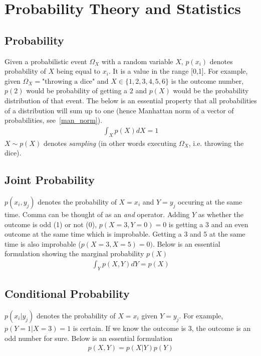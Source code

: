 \documentclass{book}
\numberwithin{equation}{subsection}
\begin{document}
\chapter{Probability Theory and Statistics}
\section{Probability}
Given a probabilistic event $\Omega_X$ with a random variable $X$, $p(x_i)$ denotes probability of $X$ being equal to $x_i$. It is a value in the range [0,1]. For example, given $\Omega_X=\text{"throwing a dice"}$ and $X \in \{1,2,3,4,5,6\}$ is the outcome number, $p(2)$ would be probability of getting a $2$ and $p(X)$ would be the probability distribution of that event. The below is an essential property that all probabilities of a distribution will sum up to one (hence Manhattan norm of a vector of probabilities, see~\ref{man_norm}).
\begin{align}
    \int_X p(X)dX = 1
\end{align}
$X \sim p(X)$ denotes \textit{sampling} (in other words executing $\Omega_X$, i.e. throwing the dice).
\section{Joint Probability}
$p(x_i, y_j)$ denotes the probability of $X=x_i$ and $Y=y_j$ occuring at the same time. Comma can be thought of as an \textit{and} operator. Adding $Y$ as whether the outcome is odd (1) or not (0), $p(X=3,Y=0)=0$ is getting a 3 and an even outcome at the same time which is improbable. Getting a 3 and 5 at the same time is also improbable ($p(X=3,X=5)=0)$. Below is an essential formulation showing the marginal probability $p(X)$
\begin{align}
    \int_Y p(X,Y)dY = p(X)
\end{align}
\section{Conditional Probability}
$p(x_i|y_j)$ denotes the probability of $X=x_i$ given $Y=y_j$. For example, $p(Y=1|X=3)=1$ is certain. If we know the outcome is 3, the outcome is an odd number for sure. Below is an essential formulation
\begin{align}
    p(X,Y) = p(X|Y)p(Y)
    \label{joint_cond_prob}
\end{align}
\end{document}
